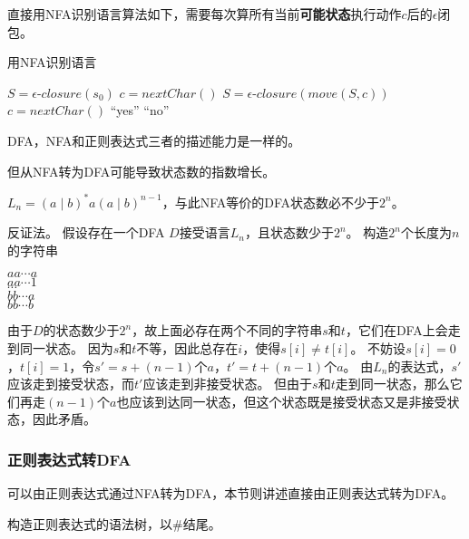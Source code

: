 直接用NFA识别语言算法如下，需要每次算所有当前\textbf{可能状态}执行动作$c$后的$\epsilon$闭包。
\begin{algorithm}[H]
\centering
\caption{用NFA识别语言}
\begin{algorithmic}[1]
\State $S=\epsilon$-$closure(s_0)$
\State $c=nextChar()$
\State $S=\epsilon$-$closure(move(S,c))$
\State $c=nextChar()$
\EndWhile
{}
\State\Return ``yes''
\Else
\State\Return ``no''
\EndIf
\end{algorithmic}
\end{algorithm}

\begin{theorem}
DFA，NFA和正则表达式三者的描述能力是一样的。
\end{theorem}

但从NFA转为DFA可能导致状态数的指数增长。
\begin{example}
$L_n=(a\mid b)^*a(a\mid b)^{n-1}$，与此NFA等价的DFA状态数必不少于$2^n$。
\end{example}
\begin{analysis}
反证法。
假设存在一个DFA $D$接受语言$L_n$，且状态数少于$2^n$。
构造$2^n$个长度为$n$的字符串
\begin{flushleft}
$aa\cdots a$\\
$aa\cdots 1$\\
$\cdots$\\
$bb\cdots a$\\
$bb\cdots b$
\end{flushleft}
由于$D$的状态数少于$2^n$，故上面必存在两个不同的字符串$s$和$t$，它们在DFA上会走到同一状态。
因为$s$和$t$不等，因此总存在$i$，使得$s[i]\ne t[i]$。
不妨设$s[i]=0$，$t[i]=1$，令$s'=s+(n-1)$个$a$，$t'=t+(n-1)$个$a$。
由$L_n$的表达式，$s'$应该走到接受状态，而$t'$应该走到非接受状态。
但由于$s$和$t$走到同一状态，那么它们再走$(n-1)$个$a$也应该到达同一状态，但这个状态既是接受状态又是非接受状态，因此矛盾。
\end{analysis}

\subsubsection{正则表达式转DFA}
可以由正则表达式通过NFA转为DFA，本节则讲述直接由正则表达式转为DFA。

构造正则表达式的语法树，以\#结尾。

